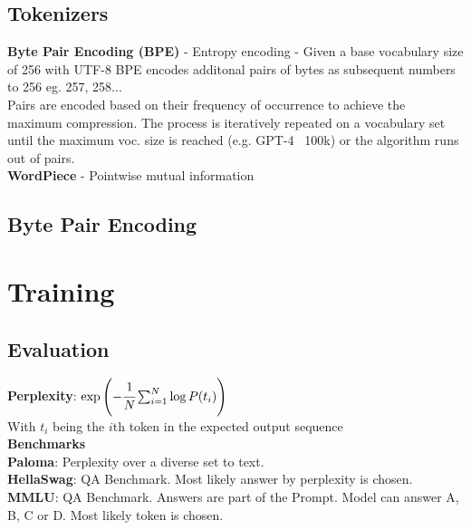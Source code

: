 \begin{multicols}{2}
\begin{mdframed}[style=eqbox]
        \subsection{Tokenizers}
        \textbf{Byte Pair Encoding (BPE)} - Entropy encoding - Given a base vocabulary size of 256 with UTF-8 BPE encodes additonal pairs of bytes as subsequent numbers to 256 eg. 257, 258...\\
        Pairs are encoded based on their frequency of occurrence to achieve the maximum compression. The process is iteratively repeated on a vocabulary set until the maximum voc. size is reached (e.g. GPT-4 ~100k) or the algorithm runs out of pairs.\\
        \textbf{WordPiece} - Pointwise mutual information
    \end{mdframed}
    \begin{mdframed}[style=eqbox]
        \subsection{Byte Pair Encoding}
    \end{mdframed}

    \section{Training}
    \begin{mdframed}[style=eqbox]
        \subsection{Evaluation}
        \textbf{Perplexity}: $\exp\left( - \cfrac{1}{N} \sum_{i=1}^{N} \log P(t_i)\right)$\\
        {\tiny With $t_i$ being the $i$th token in the expected output sequence}\\[1em]
        \textbf{Benchmarks}\\
        \textbf{Paloma}: Perplexity over a diverse set to text.\\
        \textbf{HellaSwag}: QA Benchmark. Most likely answer by perplexity is chosen.\\
        \textbf{MMLU}: QA Benchmark. Answers are part of the Prompt. Model can answer A, B, C or D. Most likely token is chosen.
    \end{mdframed}

    \begin{mdframed}[style=eqbox]

\end{mdframed}
\end{multicols}
